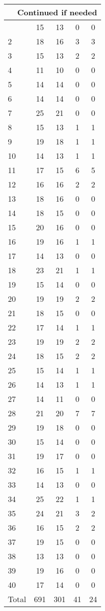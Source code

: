 \begin{center}
\begin{longtable}{l|c|c|c|c}
\hline \multicolumn{5}{|r|}{{Continued if needed}} \\ \hline
\endfoot 
1 & 15 & 13 & 0 & 0\\ \hline
2 & 18 & 16 & 3 & 3\\ \hline
3 & 15 & 13 & 2 & 2\\ \hline
4 & 11 & 10 & 0 & 0\\ \hline
5 & 14 & 14 & 0 & 0\\ \hline
6 & 14 & 14 & 0 & 0\\ \hline
7 & 25 & 21 & 0 & 0\\ \hline
8 & 15 & 13 & 1 & 1\\ \hline
9 & 19 & 18 & 1 & 1\\ \hline
10 & 14 & 13 & 1 & 1\\ \hline
11 & 17 & 15 & 6 & 5\\ \hline
12 & 16 & 16 & 2 & 2\\ \hline
13 & 18 & 16 & 0 & 0\\ \hline
14 & 18 & 15 & 0 & 0\\ \hline
15 & 20 & 16 & 0 & 0\\ \hline
16 & 19 & 16 & 1 & 1\\ \hline
17 & 14 & 13 & 0 & 0\\ \hline
18 & 23 & 21 & 1 & 1\\ \hline
19 & 15 & 14 & 0 & 0\\ \hline
20 & 19 & 19 & 2 & 2\\ \hline
21 & 18 & 15 & 0 & 0\\ \hline
22 & 17 & 14 & 1 & 1\\ \hline
23 & 19 & 19 & 2 & 2\\ \hline
24 & 18 & 15 & 2 & 2\\ \hline
25 & 15 & 14 & 1 & 1\\ \hline
26 & 14 & 13 & 1 & 1\\ \hline
27 & 14 & 11 & 0 & 0\\ \hline
28 & 21 & 20 & 7 & 7\\ \hline
29 & 19 & 18 & 0 & 0\\ \hline
30 & 15 & 14 & 0 & 0\\ \hline
31 & 19 & 17 & 0 & 0\\ \hline
32 & 16 & 15 & 1 & 1\\ \hline
33 & 14 & 13 & 0 & 0\\ \hline
34 & 25 & 22 & 1 & 1\\ \hline
35 & 24 & 21 & 3 & 2\\ \hline
36 & 16 & 15 & 2 & 2\\ \hline
37 & 19 & 15 & 0 & 0\\ \hline
38 & 13 & 13 & 0 & 0\\ \hline
39 & 19 & 16 & 0 & 0\\ \hline
40 & 17 & 14 & 0 & 0\\ \hline
\hline \hline
Total & 691 & 301 & 41 & 24



\end{longtable}
\end{center}

